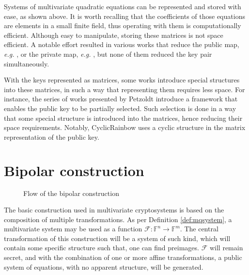 \documentclass{ufsctex/ufsctex}
\begin{document}
Systems of multivariate quadratic equations can be represented and stored with
ease, as shown above. It is worth recalling that the coefficients of those
equations are elements in a small finite field, thus operating with them is
computationally efficient. Although easy to manipulate, storing these matrices
is not space efficient. A notable effort resulted in various works that reduce
the public map, \textit{e.g.} \cite{petzoldt2010cyclicrainbow}, or the private
map, \textit{e.g.} \cite{yasuda2012reducing}, but none of them reduced the key
pair simultaneously.

With the keys represented as matrices, some works introduce special structures
into these matrices, in such a way that representing them requires less space.
For instance, the series of works presented by Petzoldt introduce a framework
that enables the public key to be partially selected. Such selection is done in
a way that some special structure is introduced into the matrices, hence
reducing their space requirements. Notably, CyclicRainbow uses a cyclic
structure in the matrix representation of the public key.

\section{Bipolar construction}\label{sec:bipolar}

\begin{figure}
\centering
{}
\caption{Flow of the bipolar construction}\label{fig:bipolar}
\end{figure}

The basic construction used in multivariate cryptosystems is based on the
composition of multiple transformations. As per Definition \ref{def:mqsystem},
a multivariate system may be used as a function
$\mathcal{F}:\mathbb{F}^n\to\mathbb{F}^m$. The central transformation of this
construction will be a system of such kind, which will contain some specific
structure such that, one can find preimages. $\mathcal{F}$ will remain secret,
and with the combination of one or more affine transformations, a public system
of equations, with no apparent structure, will be generated.
\end{document}
